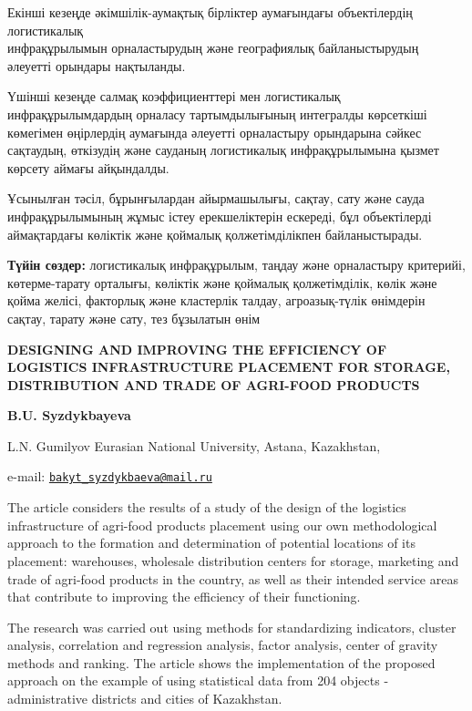 Екінші кезеңде әкімшілік-аумақтық бірліктер аумағындағы объектілердің
логистикалық \\инфрақұрылымын орналастырудың және географиялық
байланыстырудың әлеуетті орындары нақтыланды.

Үшінші кезеңде салмақ коэффициенттері мен логистикалық
инфрақұрылымдардың орналасу тартымдылығының интегралды көрсеткіші
көмегімен өңірлердің аумағында әлеуетті орналастыру орындарына сәйкес
сақтаудың, өткізудің және сауданың логистикалық инфрақұрылымына қызмет
көрсету аймағы айқындалды.

Ұсынылған тәсіл, бұрынғылардан айырмашылығы, сақтау, сату және сауда
инфрақұрылымының жұмыс істеу ерекшеліктерін ескереді, бұл объектілерді
аймақтардағы көліктік және қоймалық қолжетімділікпен байланыстырады.

{\bfseries Түйін сөздер:} логистикалық инфрақұрылым, таңдау және
орналастыру критерийі, көтерме-тарату орталығы, көліктік және қоймалық
қолжетімділік, көлік және қойма желісі, факторлық және кластерлік
талдау, агроазық-түлік өнімдерін сақтау, тарату және сату, тез бұзылатын
өнім

\begin{articleheader}
{\bfseries DESIGNING AND IMPROVING THE EFFICIENCY OF LOGISTICS
INFRASTRUCTURE PLACEMENT FOR STORAGE, DISTRIBUTION AND TRADE OF
AGRI-FOOD PRODUCTS}

{\bfseries B.U. Syzdykbayeva}
\end{articleheader}

\begin{affiliation}
L.N. Gumilyov Eurasian National University, Astana, Kazakhstan,

e-mail: \href{mailto:bakyt_syzdykbaeva@mail.ru}{\nolinkurl{bakyt\_syzdykbaeva@mail.ru}}
\end{affiliation}

The article considers the results of a study of the design of the
logistics infrastructure of agri-food products placement using our own
methodological approach to the formation and determination of potential
locations of its placement: warehouses, wholesale distribution centers
for storage, marketing and trade of agri-food products in the country,
as well as their intended service areas that contribute to improving the
efficiency of their functioning.

The research was carried out using methods for standardizing indicators,
cluster analysis, correlation and regression analysis, factor analysis,
center of gravity methods and ranking. The article shows the
implementation of the proposed approach on the example of using
statistical data from 204 objects - administrative districts and cities
of Kazakhstan.

